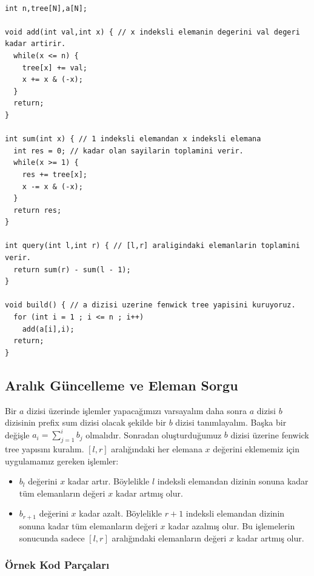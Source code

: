 \documentclass[12pt]{article}
\begin{document}
    \begin{verbatim}
    
int n,tree[N],a[N];

void add(int val,int x) { // x indeksli elemanin degerini val degeri kadar artirir.
  while(x <= n) {
    tree[x] += val;
    x += x & (-x);
  }
  return;
}

int sum(int x) { // 1 indeksli elemandan x indeksli elemana
  int res = 0; // kadar olan sayilarin toplamini verir.
  while(x >= 1) {
    res += tree[x];
    x -= x & (-x);
  }
  return res;
}

int query(int l,int r) { // [l,r] araligindaki elemanlarin toplamini verir.
  return sum(r) - sum(l - 1);
}

void build() { // a dizisi uzerine fenwick tree yapisini kuruyoruz.
  for (int i = 1 ; i <= n ; i++)
    add(a[i],i);
  return;
}

    \end{verbatim}
    
    \subsection{Aral{\i}k G\"{u}ncelleme ve Eleman Sorgu}

    Bir $a$ dizisi \"{u}zerinde i\c{s}lemler yapaca\u{g}{\i}m{\i}z{\i} varsayal{\i}m daha sonra $a$ dizisi $b$ dizisinin prefix sum dizisi olacak \c{s}ekilde bir $b$ dizisi tan{\i}mlayal{\i}m. Ba\c{s}ka bir de\u{g}i\c{s}le $a_i = \sum_{j=1}^{i} {b_j} $ olmal{\i}d{\i}r. Sonradan olu\c{s}turdu\u{g}umuz $b$ dizisi \"{u}zerine fenwick tree yap{\i}s{\i}n{\i} kural{\i}m. $[l,r]$ aral{\i}\u{g}{\i}ndaki her elemana
    $x$ de\u{g}erini eklememiz i\c{c}in uygulamam{\i}z gereken i\c{s}lemler:
    
    \begin{itemize}
        \item $b_l$ de\u{g}erini $x$ kadar art{\i}r. B\"{o}ylelikle $l$ indeksli elemandan dizinin sonuna kadar t\"{u}m elemanlar{\i}n de\u{g}eri $x$ kadar artm{\i}\c{s} olur.
        \item $b_{r + 1}$ de\u{g}erini $x$ kadar azalt. B\"{o}ylelikle $r + 1$ indeksli elemandan dizinin sonuna kadar t\"{u}m elemanlar{\i}n de\u{g}eri $x$ kadar azalm{\i}\c{s} olur. Bu i\c{s}lemelerin sonucunda sadece $[l,r]$ aral{\i}\u{g}{\i}ndaki elemanlar{\i}n de\u{g}eri $x$ kadar artm{\i}\c{s} olur.
    \end{itemize}
    
    \subsubsection{\"{O}rnek Kod Par\c{c}alar{\i}}
    
\end{document}
